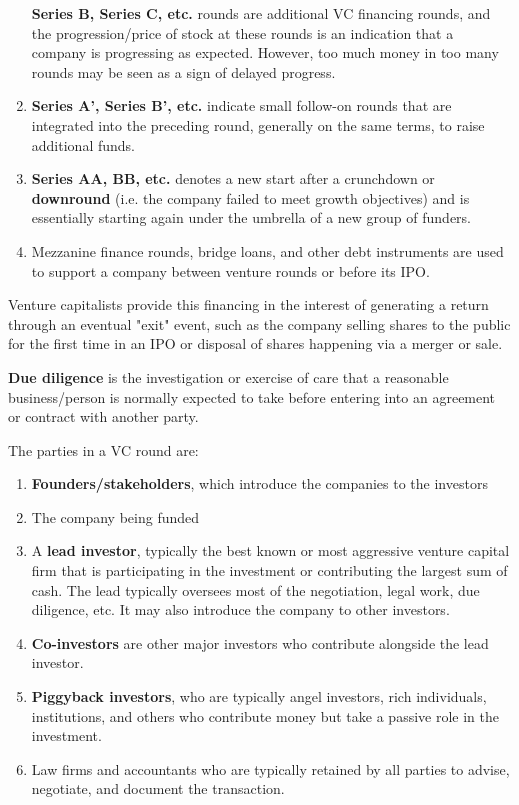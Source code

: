 \documentclass{article}
\begin{document}
\begin{definition}
\begin{enumerate}
        \textbf{Series B, Series C, etc.} rounds are additional VC financing rounds, and the progression/price of stock at these rounds is an indication that a company is progressing as expected. However, too much money in too many rounds may be seen as a sign of delayed progress.
        \item \textbf{Series A', Series B', etc.} indicate small follow-on rounds that are integrated into the preceding round, generally on the same terms, to raise additional funds. 
        \item \textbf{Series AA, BB, etc. } denotes a new start after a crunchdown or \textbf{downround} (i.e. the company failed to meet growth objectives) and is essentially starting again under the umbrella of a new group of funders. 
        \item Mezzanine finance rounds, bridge loans, and other debt instruments are used to support a company between venture rounds or before its IPO. 
      \end{enumerate}
      Venture capitalists provide this financing in the interest of generating a return through an eventual "exit" event, such as the company selling shares to the public for the first time in an IPO or disposal of shares happening via a merger or sale. 
    \end{definition}

    \begin{definition}
      \textbf{Due diligence} is the investigation or exercise of care that a reasonable business/person is normally expected to take before entering into an agreement or contract with another party. 
    \end{definition}

    \begin{definition}
      The parties in a VC round are: 
      \begin{enumerate}
        \item \textbf{Founders/stakeholders}, which introduce the companies to the investors
        \item The company being funded
        \item A \textbf{lead investor}, typically the best known or most aggressive venture capital firm that is participating in the investment or contributing the largest sum of cash. The lead typically oversees most of the negotiation, legal work, due diligence, etc. It may also introduce the company to other investors. 
        \item \textbf{Co-investors} are other major investors who contribute alongside the lead investor. 
        \item \textbf{Piggyback investors}, who are typically angel investors, rich individuals, institutions, and others who contribute money but take a passive role in the investment. 
        \item Law firms and accountants who are typically retained by all parties to advise, negotiate, and document the transaction. 
      \end{enumerate}
    \end{definition}
\end{document}
